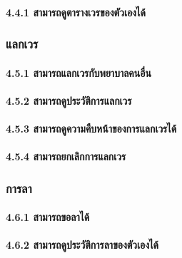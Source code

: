 \hspace{2.5cm}\paragraph{4.4.1 สามารถดูตารางเวรของตัวเองได้}

\hspace{1cm}\subsubsection{แลกเวร}

\hspace{2.5cm}\paragraph{4.5.1 สามารถแลกเวรกับพยาบาลคนอื่น}

\hspace{2.5cm}\paragraph{4.5.2 สามารถดูประวัติการแลกเวร}

\hspace{2.5cm}\paragraph{4.5.3 สามารถดูความคืบหน้าของการแลกเวรได้}

\hspace{2.5cm}\paragraph{4.5.4 สามารถยกเลิกการแลกเวร}


\hspace{1cm}\subsubsection{การลา}

\hspace{2.5cm}\paragraph{4.6.1 สามารถขอลาได้}

\hspace{2.5cm}\paragraph{4.6.2 สามารถดูประวัติการลาของตัวเองได้}


